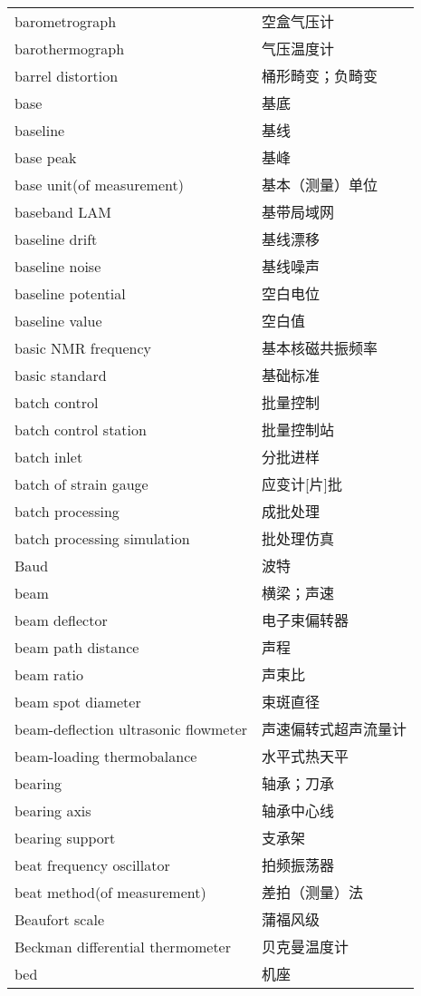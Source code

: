 \documentclass[
]{article}
\begin{document}
\begin{longtable}[]{@{}ll@{}}
barometrograph & 空盒气压计 \\
barothermograph & 气压温度计 \\
barrel distortion & 桶形畸变；负畸变 \\
base & 基底 \\
baseline & 基线 \\
base peak & 基峰 \\
base unit(of measurement) & 基本（测量）单位 \\
baseband LAM & 基带局域网 \\
baseline drift & 基线漂移 \\
baseline noise & 基线噪声 \\
baseline potential & 空白电位 \\
baseline value & 空白值 \\
basic NMR frequency & 基本核磁共振频率 \\
basic standard & 基础标准 \\
batch control & 批量控制 \\
batch control station & 批量控制站 \\
batch inlet & 分批进样 \\
batch of strain gauge & 应变计{[}片{]}批 \\
batch processing & 成批处理 \\
batch processing simulation & 批处理仿真 \\
Baud & 波特 \\
beam & 横梁；声速 \\
beam deflector & 电子束偏转器 \\
beam path distance & 声程 \\
beam ratio & 声束比 \\
beam spot diameter & 束斑直径 \\
beam-deflection ultrasonic flowmeter & 声速偏转式超声流量计 \\
beam-loading thermobalance & 水平式热天平 \\
bearing & 轴承；刀承 \\
bearing axis & 轴承中心线 \\
bearing support & 支承架 \\
beat frequency oscillator & 拍频振荡器 \\
beat method(of measurement) & 差拍（测量）法 \\
Beaufort scale & 蒲福风级 \\
Beckman differential thermometer & 贝克曼温度计 \\
bed & 机座 \\

\end{longtable}
\end{document}
